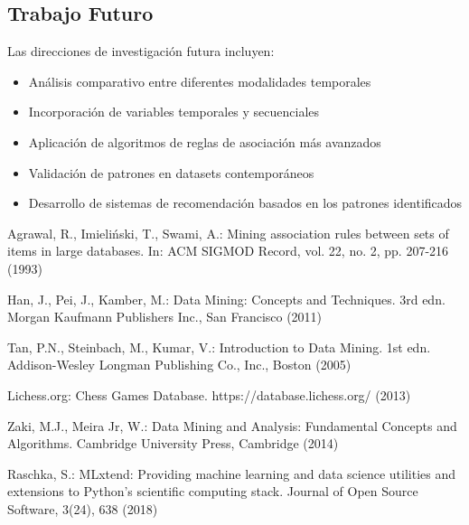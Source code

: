 \documentclass[runningheads]{llncs}
\begin{document}
\subsection{Trabajo Futuro}

Las direcciones de investigación futura incluyen:

\begin{itemize}
\item Análisis comparativo entre diferentes modalidades temporales
\item Incorporación de variables temporales y secuenciales  
\item Aplicación de algoritmos de reglas de asociación más avanzados
\item Validación de patrones en datasets contemporáneos
\item Desarrollo de sistemas de recomendación basados en los patrones identificados
\end{itemize}

\begin{thebibliography}{9}

Agrawal, R., Imieliński, T., Swami, A.: Mining association rules between sets of items in large databases. In: ACM SIGMOD Record, vol. 22, no. 2, pp. 207-216 (1993)

Han, J., Pei, J., Kamber, M.: Data Mining: Concepts and Techniques. 3rd edn. Morgan Kaufmann Publishers Inc., San Francisco (2011)

Tan, P.N., Steinbach, M., Kumar, V.: Introduction to Data Mining. 1st edn. Addison-Wesley Longman Publishing Co., Inc., Boston (2005)

Lichess.org: Chess Games Database. https://database.lichess.org/ (2013)

Zaki, M.J., Meira Jr, W.: Data Mining and Analysis: Fundamental Concepts and Algorithms. Cambridge University Press, Cambridge (2014)

Raschka, S.: MLxtend: Providing machine learning and data science utilities and extensions to Python's scientific computing stack. Journal of Open Source Software, 3(24), 638 (2018)

\end{thebibliography}
\end{document}
